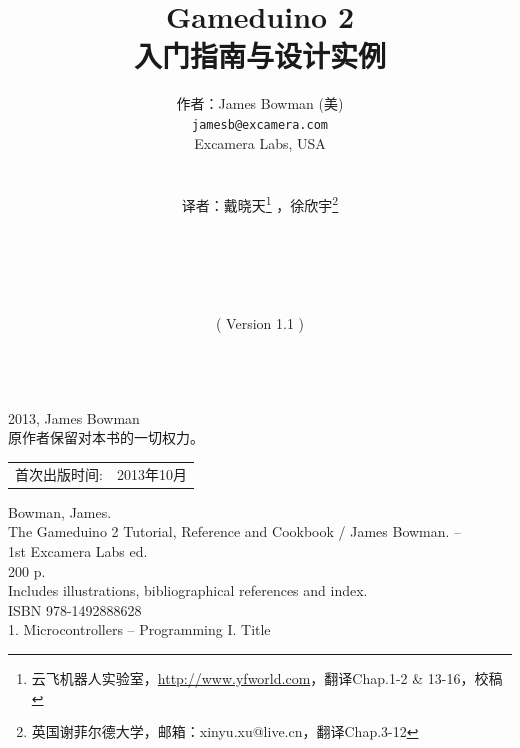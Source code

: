 \documentclass[10pt]{book}
\title{\LARGE \bf
Gameduino 2\\
入门指南与设计实例
}
\author{作者：James Bowman (美) \\
	{\tt\small jamesb@excamera.com} \\
  Excamera Labs, USA\\
   \\
   \\
  译者：戴晓天\footnote{云飞机器人实验室，\url{http://www.yfworld.com}，翻译Chap.1-2 \& 13-16，校稿}
  ，徐欣宇\footnote{英国谢菲尔德大学，邮箱：xinyu.xu@live.cn，翻译Chap.3-12}\\
  \\
  \\
  \\
  \\
  \\
  ( Version 1.1 )
  \\
  \\  
}
\date{}
\begin{document}
\begin{CJK}{UTF8}{gkai}
\maketitle

\begingroup
\footnotesize
\parindent 0pt
\parskip \baselineskip
\textcopyright{} 2013, James Bowman \\
原作者保留对本书的一切权力。

% 
% 
% 
% 

\begin{center}
\begin{tabular}{ll}
首次出版时间:  & 2013年10月 \\
\end{tabular}
\end{center}

\vfill

Bowman, James.\\
\hspace*{2em} The Gameduino 2 Tutorial, Reference and Cookbook / James Bowman. -- \\
\hspace*{1em} 1st Excamera Labs ed. \\
\hspace*{2em} 200 p. \hspace*{2em} \\
\hspace*{2em} Includes illustrations, bibliographical references and index. \\
\hspace*{2em} ISBN 978-1492888628 \\
\hspace*{2em} 1. Microcontrollers -- Programming \hspace*{2em} I. Title



\end{CJK}
\end{document}
